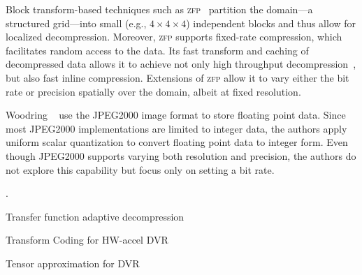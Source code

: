 \newcommand{\zfp}{\textsc{zfp}\xspace}
Block transform-based techniques such as \zfp~\cite{zfp2014} partition the domain---a structured
grid---into small (e.g., $4 \times 4 \times 4$) independent blocks and thus allow for localized
decompression. Moreover, \zfp supports fixed-rate compression, which facilitates random access to
the data. Its fast transform and caching of decompressed data allows it to achieve not only high
throughput decompression~\cite{hvq}, but also fast inline compression. Extensions of \zfp allow it
to vary either the bit rate or precision spatially over the domain, albeit at fixed resolution.


Woodring \etal~\cite{woodring2011} use the JPEG2000 image format to store floating point data.
Since most JPEG2000 implementations are limited to integer data, the authors apply uniform scalar
quantization to convert floating point data to integer form. Even though JPEG2000 supports varying
both resolution and precision, the authors do not explore this capability but focus only on setting
a bit rate.

.

Transfer function adaptive decompression~\cite{tf_decompression2004}

Transform Coding for HW-accel DVR~\cite{hw_dvr2007}

Tensor approximation for DVR~\cite{tensor_dvr2015}

